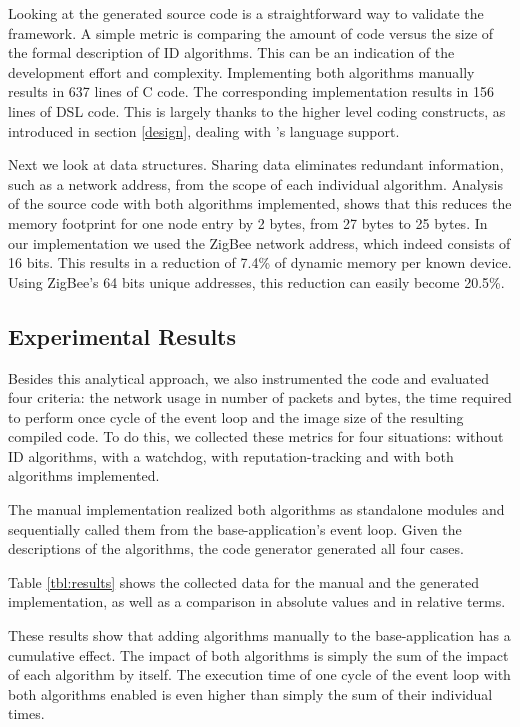 \documentclass[conference]{IEEEtran}
\begin{document}
Looking at the generated source code is a straightforward way to validate the
framework. A simple metric is comparing the amount of code versus the size of
the formal description of ID algorithms. This can be an indication of the
development effort and complexity. Implementing both algorithms manually
results in 637 lines of C code. The corresponding \NAME implementation results
in 156 lines of DSL code. This is largely thanks to the higher level coding
constructs, as introduced in section \ref{design}, dealing with \NAME's
language support.

Next we look at data structures. Sharing data eliminates redundant information,
such as a network address, from the scope of each individual algorithm.
Analysis of the source code with both algorithms implemented, shows that this
reduces the memory footprint for one node entry by 2 bytes, from 27 bytes to 25
bytes. In our implementation we used the ZigBee network address, which indeed
consists of 16 bits. This results in a reduction of 7.4\% of dynamic memory per
known device. Using ZigBee's 64 bits unique addresses, this reduction can
easily become 20.5\%.

\subsection{Experimental Results}

Besides this analytical approach, we also instrumented the code and evaluated
four criteria: the network usage in number of packets and bytes, the time
required to perform once cycle of the event loop and the image size of the
resulting compiled code. To do this, we collected these metrics for four
situations: without ID algorithms, with a watchdog, with reputation-tracking
and with both algorithms implemented.

The manual implementation realized both algorithms as standalone modules and
sequentially called them from the base-application's event loop. Given the
\NAME descriptions of the algorithms, the code generator generated all four
cases.

Table \ref{tbl:results} shows the collected data for the manual and the
generated implementation, as well as a comparison in absolute values and in
relative terms.

These results show that adding algorithms manually to the base-application has
a cumulative effect. The impact of both algorithms is simply the sum of the
impact of each algorithm by itself. The execution time of one cycle of the
event loop with both algorithms enabled is even higher than simply the sum of
their individual times.
\end{document}

